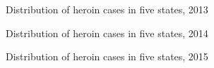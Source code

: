 \documentclass{mcmthesis}
\numberwithin{equation}{section}
\numberwithin{figure}{section}
\numberwithin{table}{section}
\theoremstyle{mydef}
\begin{document}
\begin{appendices}
\begin{figure}[H]
  \caption{Distribution of heroin cases in five states, 2013}\label{fighe13}
\end{figure}
\begin{figure}[H]
  \caption{Distribution of heroin cases in five states, 2014}\label{fighe14}
\end{figure}
\begin{figure}[H]
  \caption{Distribution of heroin cases in five states, 2015}\label{fighe15}

\end{figure}
\end{appendices}
\end{document}
